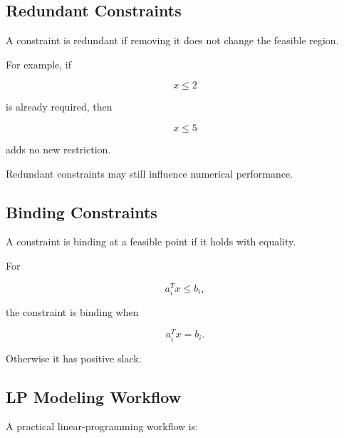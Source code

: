 \subsection{Redundant Constraints}
\label{subsec:lp-redundant-constraints}

A constraint is redundant if removing it does not change the feasible
region.

For example, if

\[
x\leq2
\]

is already required, then

\[
x\leq5
\]

adds no new restriction.

Redundant constraints may still influence numerical performance.

\subsection{Binding Constraints}
\label{subsec:binding-constraints-lp}

A constraint is binding at a feasible point if it holds with equality.

For

\[
a_i^Tx\leq b_i,
\]

the constraint is binding when

\[
\boxed{
a_i^Tx=b_i.
}
\]

Otherwise it has positive slack.

\subsection{LP Modeling Workflow}
\label{subsec:lp-modeling-workflow}

A practical linear-programming workflow is:

